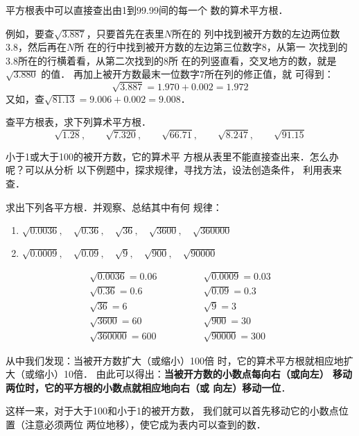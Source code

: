 平方根表中可以直接查出由1到99.99间的每一个
数的算术平方根．

例如，要查$\sqrt{3.887}$，只要首先在表里$N$所在的
列中找到被开方数的左边两位数3.8，然后再在$N$所
在的行中找到被开方数的左边第三位数字8，从第一
次找到的3.8所在的行横着看，从第二次找到的8所
在的列竖直看，交叉地方的数，就是$\sqrt{3.880}$ 的值．
再加上被开方数最末一位数字7所在列的修正值，就
可得到：
\[\sqrt{3.887}=1.970+0.002=1.972\]
又如，查$\sqrt{81.13}=9.006+0.002=9.008$． 

\begin{ex}
    查平方根表，求下列算术平方根．
\[\sqrt{1.28},\qquad \sqrt{7.320},\qquad \sqrt{66.71},\qquad \sqrt{8.247},\qquad \sqrt{91.15} \]
\end{ex}

小于1或大于100的被开方数，它的算术平
方根从表里不能直接查出来．怎么办呢？可以从分析
以下例题中，探求规律，寻找方法，设法创造条件，
利用表来查．


\begin{example}
    求出下列各平方根．并观察、总结其中有何
规律：
\begin{enumerate}
    \item $\sqrt{0.0036},\quad \sqrt{0.36},\quad \sqrt{36},\quad \sqrt{3600},\quad \sqrt{360000}$
    \item $\sqrt{0.0009},\quad \sqrt{0.09},\quad \sqrt{9},\quad \sqrt{900},\quad \sqrt{90000} $
\end{enumerate}
\end{example}

\begin{solution}
\[\begin{array}{ll}
    \sqrt{0.0036}=0.06\qquad \qquad  &  \sqrt{0.0009}=0.03 \\
     \sqrt{0.36}=0.6 &  \sqrt{0.09}=0.3\\
      \sqrt{36}=6 & \sqrt{9}=3 \\
      \sqrt{3600}=60 &  \sqrt{900}=30 \\
       \sqrt{360000}=600 &  \sqrt{90000} =300
\end{array}\]
\end{solution}

从中我们发现：当被开方数扩大（或缩小）100倍
时，它的算术平方根就相应地扩大（或缩小）10倍．
由此可以得出：\textbf{当被开方数的小数点每向右（或向左）
移动两位时，它的平方根的小数点就相应地向右（或
向左）移动一位}．

这样一来，对于大于100和小于1的被开方数，
我们就可以首先移动它的小数点位置（注意必须两位
两位地移），使它成为表内可以查到的数．

